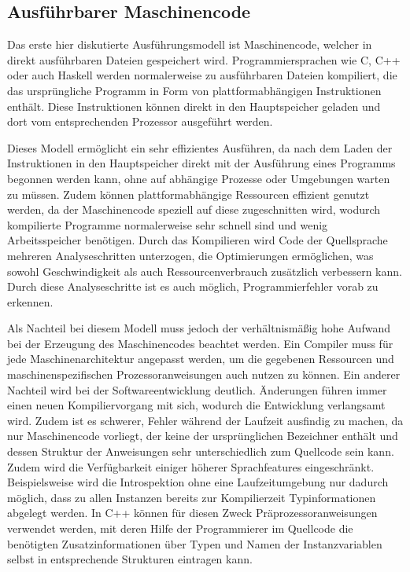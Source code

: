 \documentclass[11pt, parskip=half]{scrartcl}       %
\begin{document}
\subsection{Ausführbarer Maschinencode}

Das erste hier diskutierte Ausführungsmodell ist Maschinencode, welcher in direkt ausführbaren Dateien gespeichert wird.
Programmiersprachen wie C, C++ oder auch Haskell werden normalerweise zu ausführbaren Dateien kompiliert, die das ursprüngliche Programm in Form von plattformabhängigen Instruktionen enthält.
Diese Instruktionen können direkt in den Hauptspeicher geladen und dort vom entsprechenden Prozessor ausgeführt werden.

Dieses Modell ermöglicht ein sehr effizientes Ausführen, da nach dem Laden der Instruktionen in den Hauptspeicher direkt mit der Ausführung eines Programms begonnen werden kann, ohne auf abhängige Prozesse oder Umgebungen warten zu müssen.
Zudem können plattformabhängige Ressourcen effizient genutzt werden, da der Maschinencode speziell auf diese zugeschnitten wird, wodurch kompilierte Programme normalerweise sehr schnell sind und wenig Arbeitsspeicher benötigen.
Durch das Kompilieren wird Code der Quellsprache mehreren Analyseschritten unterzogen, die Optimierungen ermöglichen, was sowohl Geschwindigkeit als auch Ressourcenverbrauch zusätzlich verbessern kann.
Durch diese Analyseschritte ist es auch möglich, Programmierfehler vorab zu erkennen.

Als Nachteil bei diesem Modell muss jedoch der verhältnismäßig hohe Aufwand bei der Erzeugung des Maschinencodes beachtet werden.
Ein Compiler muss für jede Maschinenarchitektur angepasst werden, um die gegebenen Ressourcen und maschinenspezifischen Prozessoranweisungen auch nutzen zu können.
Ein anderer Nachteil wird bei der Softwareentwicklung deutlich.
Änderungen führen immer einen neuen Kompiliervorgang mit sich, wodurch die Entwicklung verlangsamt wird.
Zudem ist es schwerer, Fehler während der Laufzeit ausfindig zu machen, da nur Maschinencode vorliegt, der keine der ursprünglichen Bezeichner enthält und dessen Struktur der Anweisungen sehr unterschiedlich zum Quellcode sein kann.
Zudem wird die Verfügbarkeit einiger höherer Sprachfeatures eingeschränkt.
Beispielsweise wird die Introspektion ohne eine Laufzeitumgebung nur dadurch möglich, dass zu allen Instanzen bereits zur Kompilierzeit Typinformationen abgelegt werden.
In C++ können für diesen Zweck Präprozessoranweisungen verwendet werden, mit deren Hilfe der Programmierer im Quellcode die benötigten Zusatzinformationen über Typen und Namen der Instanzvariablen selbst in entsprechende Strukturen eintragen kann.
\end{document}
